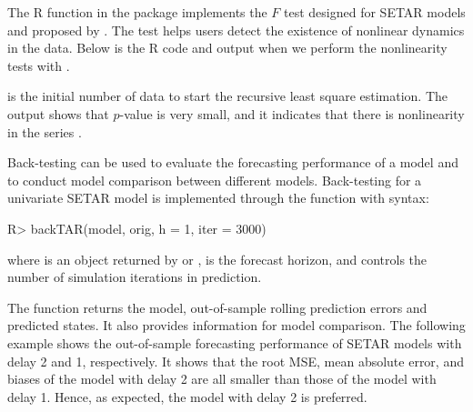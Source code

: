 \medskip
The R function  in the  package implements the $F$ test designed for SETAR models and proposed by \cite{tsay1989}. The test helps users detect the existence of nonlinear dynamics in the data. Below is the {R} code and output when we perform the nonlinearity tests with .
 is the initial number of data to start the recursive least square estimation. The output shows that $p$-value is very small, and it indicates that there is nonlinearity in the series .



\medskip
Back-testing can be used to evaluate the forecasting performance of a model and to
 conduct model comparison between different models. Back-testing for a univariate SETAR model is implemented through the function  with syntax:
\begin{example}
R> backTAR(model, orig, h = 1, iter = 3000)
\end{example}
where  is an object returned by  or ,  is the forecast horizon, and  controls the number of simulation iterations in prediction.

The function returns the model, out-of-sample rolling prediction errors and predicted states. It also
provides information  for model comparison. The following example shows the out-of-sample forecasting performance of SETAR models with delay 2 and 1, respectively. It shows that the root MSE,  mean absolute error, and biases of the model with delay 2 are all smaller than those of the model with delay 1. Hence, as expected, the model with delay 2 is preferred.

